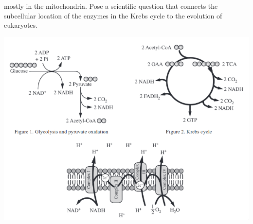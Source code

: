 \documentclass{article}
\begin{document}
\begin{enumerate}
\begin{itemize}
mostly in the mitochondria. Pose a scientific question that connects the subcellular location of the enzymes in the Krebs cycle to the evolution of eukaryotes. 
\begin{center}
\includegraphics[scale=0.3]{etc}
\end{center}
\end{itemize}
\end{enumerate}
\end{document}
